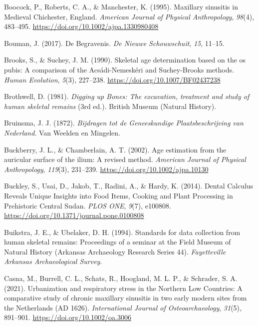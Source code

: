 \documentclass[
  b5paper,
]{book}
\newlength{\cslhangindent}
\newenvironment{CSLReferences}[2] %
 {\begin{list}{}{%
  \setlength{\itemindent}{0pt}
  \setlength{\leftmargin}{0pt}
  \setlength{\parsep}{0pt}
  \ifodd #1
   \setlength{\leftmargin}{\cslhangindent}
   \setlength{\itemindent}{-1\cslhangindent}
  \fi
  \setlength{\itemsep}{#2\baselineskip}}}
 {\end{list}}
\begin{document}
\begin{CSLReferences}{1}{0}
Boocock, P., Roberts, C. A., \& Manchester, K. (1995). Maxillary
sinusitis in {Medieval Chichester}, {England}. \emph{American Journal of
Physical Anthropology}, \emph{98}(4), 483--495.
\url{https://doi.org/10.1002/ajpa.1330980408}

Bouman, J. (2017). {De Begravenis}. \emph{De Nieuwe Schouwschuit},
\emph{15}, 11--15.

Brooks, S., \& Suchey, J. M. (1990). Skeletal age determination based on
the os pubis: {A} comparison of the {Acsádi-Nemeskéri} and
{Suchey-Brooks} methods. \emph{Human Evolution}, \emph{5}(3), 227--238.
\url{https://doi.org/10.1007/BF02437238}

Brothwell, D. (1981). \emph{Digging up {Bones}: {The} excavation,
treatment and study of human skeletal remains} (3rd ed.). {British
Museum (Natural History)}.

Bruinsma, J. J. (1872). \emph{Bijdragen tot de {Geneeskundige
Plaatsbeschrijving} van {Nederland}}. {Van Weelden en Mingelen}.

Buckberry, J. L., \& Chamberlain, A. T. (2002). {Age estimation from the
auricular surface of the ilium: A revised method}. \emph{American
Journal of Physical Anthropology}, \emph{119}(3), 231--239.
\url{https://doi.org/10.1002/ajpa.10130}

Buckley, S., Usai, D., Jakob, T., Radini, A., \& Hardy, K. (2014).
Dental {Calculus Reveals Unique Insights} into {Food Items}, {Cooking}
and {Plant Processing} in {Prehistoric Central Sudan}. \emph{PLOS ONE},
\emph{9}(7), e100808. \url{https://doi.org/10.1371/journal.pone.0100808}

Buikstra, J. E., \& Ubelaker, D. H. (1994). Standards for data
collection from human skeletal remains: {Proceedings} of a seminar at
the {Field Museum} of {Natural History} ({Arkansas Archaeology Research
Series} 44). \emph{Fayetteville Arkansas Archaeological Survey}.

Casna, M., Burrell, C. L., Schats, R., Hoogland, M. L. P., \& Schrader,
S. A. (2021). Urbanization and respiratory stress in the {Northern Low
Countries}: {A} comparative study of chronic maxillary sinusitis in two
early modern sites from the {Netherlands} ({AD} 1626).
\emph{International Journal of Osteoarchaeology}, \emph{31}(5),
891--901. \url{https://doi.org/10.1002/oa.3006}


\end{CSLReferences}
\end{document}
